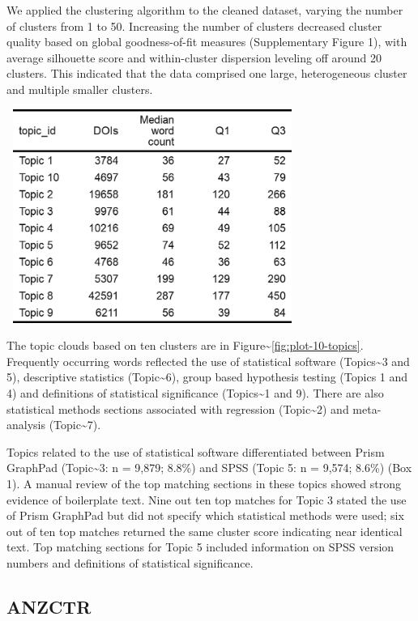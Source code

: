 \documentclass[12pt]{article}
\begin{document}
We applied the clustering algorithm to the cleaned dataset, varying the
number of clusters from 1 to 50. Increasing the number of clusters
decreased cluster quality based on global goodness-of-fit measures
(Supplementary Figure 1), with average silhouette score and
within-cluster dispersion leveling off around 20 clusters. This
indicated that the data comprised one large, heterogeneous cluster and
multiple smaller clusters.

\includegraphics[width=3.75in,height=2.75in,keepaspectratio]{asa_template_files/figure-latex/unnamed-chunk-6-1.png}

The topic clouds based on ten clusters are in
Figure\textasciitilde{}\ref{fig:plot-10-topics}. Frequently occurring
words reflected the use of statistical software (Topics\textasciitilde3
and 5), descriptive statistics (Topic\textasciitilde6), group based
hypothesis testing (Topics 1 and 4) and definitions of statistical
significance (Topics\textasciitilde1 and 9). There are also statistical
methods sections associated with regression (Topic\textasciitilde2) and
meta-analysis (Topic\textasciitilde7).

Topics related to the use of statistical software differentiated between
Prism GraphPad (Topic\textasciitilde3: n = 9,879; 8.8\%) and SPSS (Topic
5: n = 9,574; 8.6\%) (Box 1). A manual review of the top matching
sections in these topics showed strong evidence of boilerplate text.
Nine out ten top matches for Topic 3 stated the use of Prism GraphPad
but did not specify which statistical methods were used; six out of ten
top matches returned the same cluster score indicating near identical
text. Top matching sections for Topic 5 included information on SPSS
version numbers and definitions of statistical significance.

\subsection{ANZCTR}
\end{document}
